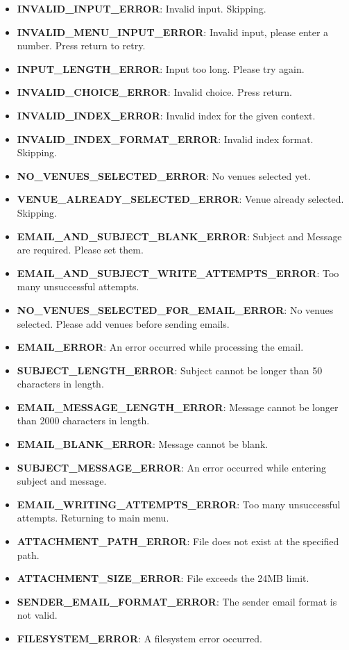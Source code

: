 \documentclass{article}
\begin{document}
	\begin{itemize}
		\item \textbf{INVALID\_INPUT\_ERROR}: Invalid input. Skipping.
		\item \textbf{INVALID\_MENU\_INPUT\_ERROR}: Invalid input, please enter a number. Press return to retry.
		\item \textbf{INPUT\_LENGTH\_ERROR}: Input too long. Please try again.
		\item \textbf{INVALID\_CHOICE\_ERROR}: Invalid choice. Press return.
		\item \textbf{INVALID\_INDEX\_ERROR}: Invalid index for the given context.
		\item \textbf{INVALID\_INDEX\_FORMAT\_ERROR}: Invalid index format. Skipping.
		\item \textbf{NO\_VENUES\_SELECTED\_ERROR}: No venues selected yet.
		\item \textbf{VENUE\_ALREADY\_SELECTED\_ERROR}: Venue already selected. Skipping.
		\item \textbf{EMAIL\_AND\_SUBJECT\_BLANK\_ERROR}: Subject and Message are required. Please set them.
		\item \textbf{EMAIL\_AND\_SUBJECT\_WRITE\_ATTEMPTS\_ERROR}: Too many unsuccessful attempts.
		\item \textbf{NO\_VENUES\_SELECTED\_FOR\_EMAIL\_ERROR}: No venues selected. Please add venues before sending emails.
		\item \textbf{EMAIL\_ERROR}: An error occurred while processing the email.
		\item \textbf{SUBJECT\_LENGTH\_ERROR}: Subject cannot be longer than 50 characters in length.
		\item \textbf{EMAIL\_MESSAGE\_LENGTH\_ERROR}: Message cannot be longer than 2000 characters in length.
		\item \textbf{EMAIL\_BLANK\_ERROR}: Message cannot be blank.
		\item \textbf{SUBJECT\_MESSAGE\_ERROR}: An error occurred while entering subject and message.
		\item \textbf{EMAIL\_WRITING\_ATTEMPTS\_ERROR}: Too many unsuccessful attempts. Returning to main menu.
		\item \textbf{ATTACHMENT\_PATH\_ERROR}: File does not exist at the specified path.
		\item \textbf{ATTACHMENT\_SIZE\_ERROR}: File exceeds the 24MB limit.
		\item \textbf{SENDER\_EMAIL\_FORMAT\_ERROR}: The sender email format is not valid.
		\item \textbf{FILESYSTEM\_ERROR}: A filesystem error occurred.

\end{itemize}
\end{document}
